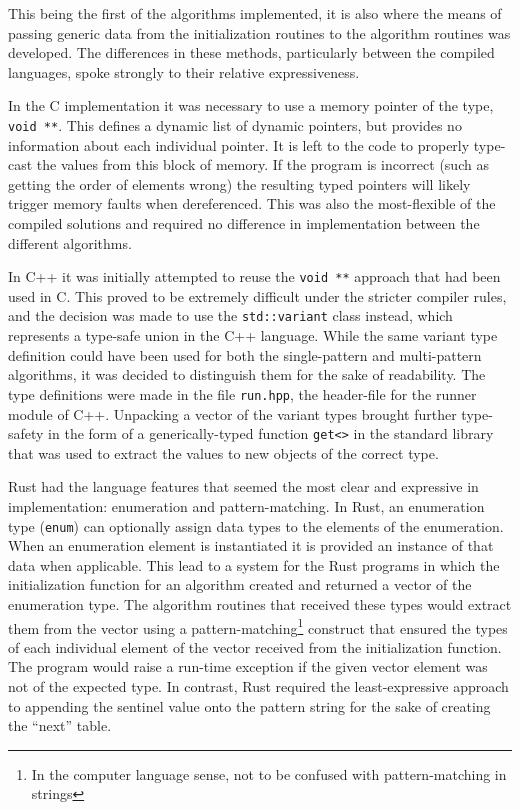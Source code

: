 This being the first of the algorithms implemented, it is also where the means of passing generic data from the initialization routines to the algorithm routines was developed. The differences in these methods, particularly between the compiled languages, spoke strongly to their relative expressiveness.

In the C implementation it was necessary to use a memory pointer of the type, \texttt{void **}. This defines a dynamic list of dynamic pointers, but provides no information about each individual pointer. It is left to the code to properly type-cast the values from this block of memory. If the program is incorrect (such as getting the order of elements wrong) the resulting typed pointers will likely trigger memory faults when dereferenced. This was also the most-flexible of the compiled solutions and required no difference in implementation between the different algorithms.

In C++ it was initially attempted to reuse the \texttt{void **} approach that had been used in C. This proved to be extremely difficult under the stricter compiler rules, and the decision was made to use the \texttt{std::variant} class instead, which represents a type-safe union in the C++ language. While the same variant type definition could have been used for both the single-pattern and multi-pattern algorithms, it was decided to distinguish them for the sake of readability. The type definitions were made in the file \texttt{run.hpp}, the header-file for the runner module of C++. Unpacking a vector of the variant types brought further type-safety in the form of a generically-typed function \texttt{get<>} in the standard library that was used to extract the values to new objects of the correct type.

Rust had the language features that seemed the most clear and expressive in implementation: enumeration and pattern-matching. In Rust, an enumeration type (\texttt{enum}) can optionally assign data types to the elements of the enumeration. When an enumeration element is instantiated it is provided an instance of that data when applicable. This lead to a system for the Rust programs in which the initialization function for an algorithm created and returned a vector of the enumeration type. The algorithm routines that received these types would extract them from the vector using a pattern-matching\footnote{In the computer language sense, not to be confused with pattern-matching in strings} construct that ensured the types of each individual element of the vector received from the initialization function. The program would raise a run-time exception if the given vector element was not of the expected type. In contrast, Rust required the least-expressive approach to appending the sentinel value onto the pattern string for the sake of creating the ``next'' table.

